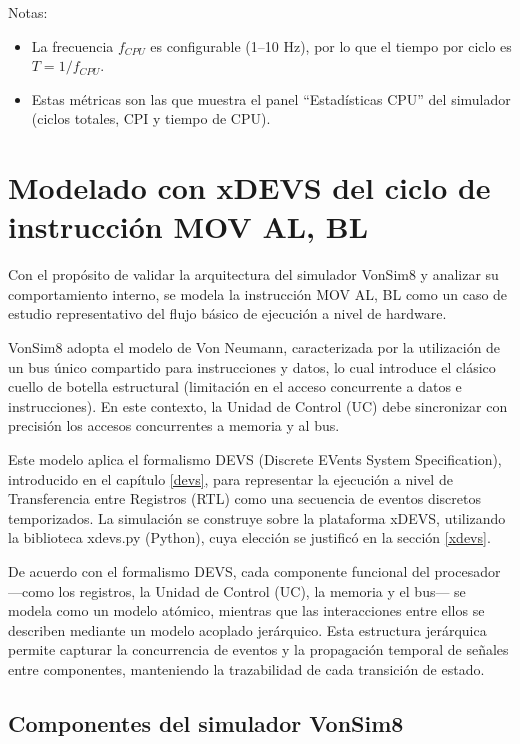 \documentclass[12pt,oneside]{templates/unerthesis}
\begin{document}
Notas:

\begin{itemize}
\item
  La frecuencia \(f_{CPU}\) es configurable (1--10 Hz), por lo que el tiempo por ciclo es \(T=1/f_{CPU}\).
\item
  Estas métricas son las que muestra el panel ``Estadísticas CPU'' del simulador (ciclos totales, CPI y tiempo de CPU).
\end{itemize}

\hypertarget{movalbl}{%
\section{Modelado con xDEVS del ciclo de instrucción MOV AL, BL}\label{movalbl}}

Con el propósito de validar la arquitectura del simulador VonSim8 y analizar su comportamiento interno, se modela la instrucción MOV AL, BL como un caso de estudio representativo del flujo básico de ejecución a nivel de hardware.

VonSim8 adopta el modelo de Von Neumann, caracterizada por la utilización de un bus único compartido para instrucciones y datos, lo cual introduce el clásico cuello de botella estructural (limitación en el acceso concurrente a datos e instrucciones). En este contexto, la Unidad de Control (UC) debe sincronizar con precisión los accesos concurrentes a memoria y al bus.

Este modelo aplica el formalismo DEVS (Discrete EVents System Specification), introducido en el capítulo \ref{devs}, para representar la ejecución a nivel de Transferencia entre Registros (RTL) como una secuencia de eventos discretos temporizados. La simulación se construye sobre la plataforma xDEVS, utilizando la biblioteca xdevs.py (Python), cuya elección se justificó en la sección \ref{xdevs}.

De acuerdo con el formalismo DEVS, cada componente funcional del procesador ---como los registros, la Unidad de Control (UC), la memoria y el bus--- se modela como un modelo atómico, mientras que las interacciones entre ellos se describen mediante un modelo acoplado jerárquico. Esta estructura jerárquica permite capturar la concurrencia de eventos y la propagación temporal de señales entre componentes, manteniendo la trazabilidad de cada transición de estado.

\hypertarget{componentes-del-simulador-vonsim8}{%
\subsection{Componentes del simulador VonSim8}\label{componentes-del-simulador-vonsim8}}
\end{document}
